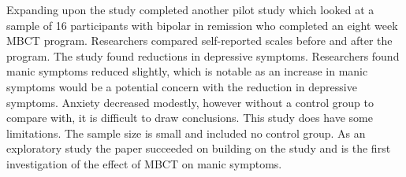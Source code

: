 Expanding upon the \citep{williams_mindfulness-based_2008} study \citep{miklowitz_pilot_2009} completed another pilot study which looked at a sample of 16 participants with bipolar in remission who completed an eight week MBCT program. Researchers compared self-reported scales before and after the program. The study found reductions in depressive symptoms. Researchers found manic symptoms reduced slightly, which is notable as an increase in manic symptoms would be a potential concern with the reduction in depressive symptoms. Anxiety decreased modestly, however without a control group to compare with, it is difficult to draw conclusions. This study does have some limitations. The sample size is small and included no control group. As an exploratory study the paper succeeded on building on the \citep{williams_mindfulness-based_2008} study and is the first investigation of the effect of MBCT on manic symptoms.
  